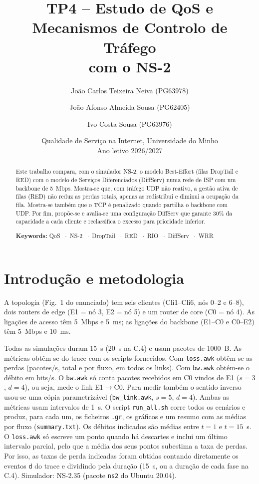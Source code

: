 \IfFileExists{llncs.cls}{\documentclass[runningheads]{llncs}}{\documentclass{article}}
\newcommand{\institute}[1]{\date{#1}}
\newcommand{\titlerunning}[1]{}
\newcommand{\authorrunning}[1]{}
\newcommand{\keywords}[1]{\par\smallskip\noindent\textbf{Keywords:} {\def\and{\unskip\ $\cdot$\ }#1}}
\begin{document}
\title{TP4 -- Estudo de QoS e Mecanismos de Controlo de Tráfego\\com o NS-2}
\titlerunning{TP4 -- QoS e Controlo de Tráfego}
\author{João Carlos Teixeira Neiva (PG63978) \and João Afonso Almeida Sousa (PG62405) \and Ivo Costa Sousa (PG63976)}
\authorrunning{Grupo 06}
\institute{Qualidade de Serviço na Internet, Universidade do Minho\\Ano letivo 2026/2027}
\maketitle

\begin{abstract}
Este trabalho compara, com o simulador NS-2, o modelo Best-Effort (filas DropTail e RED) com
o modelo de Serviços Diferenciados (DiffServ) numa rede de ISP com um backbone de 5~Mbps.
Mostra-se que, com tráfego UDP não reativo, a gestão ativa de filas (RED) não reduz as perdas
totais, apenas as redistribui e diminui a ocupação da fila. Mostra-se também que o TCP é
penalizado quando partilha o backbone com UDP. Por fim, propõe-se e avalia-se uma
configuração DiffServ que garante 30\% da capacidade a cada cliente e reclassifica o excesso
para prioridade inferior.
\keywords{QoS \and NS-2 \and DropTail \and RED \and RIO \and DiffServ \and WRR}
\end{abstract}

\section{Introdução e metodologia}
A topologia (Fig.~1 do enunciado) tem seis clientes (Cli1--Cli6, nós 0--2 e 6--8), dois
routers de edge (E1 = nó 3, E2 = nó 5) e um router de core (C0 = nó 4). As ligações de acesso
têm 5~Mbps e 5~ms; as ligações do backbone (E1--C0 e C0--E2) têm 5~Mbps e 10~ms.

Todas as simulações duram 15~s (20~s na C.4) e usam pacotes de 1000~B. As métricas obtêm-se
do trace com os scripts fornecidos. Com \texttt{loss.awk} obtêm-se as perdas (pacotes/s, total
e por fluxo, em todos os links). Com \texttt{bw.awk} obtém-se o débito em bits/s. O
\texttt{bw.awk} só conta pacotes recebidos em C0 vindos de E1 ($s=3$, $d=4$), ou seja, mede o
link E1$\rightarrow$C0. Para medir também o sentido inverso usou-se uma cópia parametrizável
(\texttt{bw\_link.awk}, $s=5$, $d=4$). Ambas as métricas usam intervalos de 1~s. O script
\texttt{run\_all.sh} corre todos os cenários e produz, para cada um, os ficheiros
\texttt{.gr}, os gráficos e um resumo com as médias por fluxo (\texttt{summary.txt}).
Os débitos indicados são médias entre $t=1$ e $t=15$~s. O \texttt{loss.awk} só escreve um
ponto quando há descartes e inclui um último intervalo parcial, pelo que a média dos seus
pontos subestima a taxa de perdas. Por isso, as taxas de perda indicadas foram obtidas
contando diretamente os eventos \texttt{d} do trace e dividindo pela duração (15~s, ou a
duração de cada fase na C.4).
Simulador: NS-2.35 (pacote \texttt{ns2} do Ubuntu 20.04).
\end{document}
